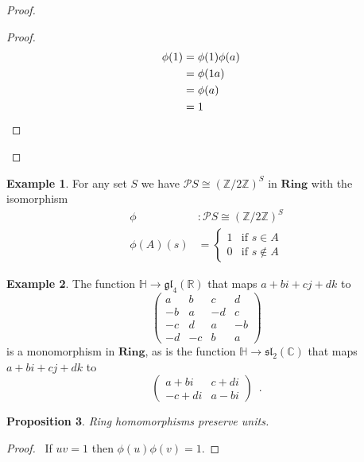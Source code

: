 \documentclass{book}
\let\qed\relax
\newtheorem{prop}{Proposition}[chapter]
\theoremstyle{definition}
\newtheorem{ex}[prop]{Example}
\begin{document}
\begin{proof}
\pf
{}
\begin{proof}
\pf
\begin{align*}
\phi(1) & = \phi(1) \phi(a) \\
& = \phi(1a) \\
& = \phi(a) \\
& = 1 & \qed
\end{align*}
\end{proof}
\end{proof}

\begin{ex}
For any set $S$ we have $\mathcal{P} S \cong (\mathbb{Z} / 2 \mathbb{Z})^S$ in $\mathbf{Ring}$ with the isomorphism
\begin{align*}
\phi & : \mathcal{P} S \cong (\mathbb{Z} / 2 \mathbb{Z})^S \\
\phi(A)(s) & = \begin{cases}
1 & \text{if } s \in A \\
0 & \text{if } s \notin A
\end{cases}
\end{align*}
\end{ex}

\begin{ex}
The function $\mathbb{H} \rightarrow \mathfrak{gl}_4(\mathbb{R})$ that maps $a + bi + cj + dk$ to
\[ \left( \begin{array}{cccc}
a & b & c & d \\
-b & a & -d & c \\
-c & d & a & -b \\
-d & -c & b & a
\end{array} \right) \]
is a monomorphism in $\mathbf{Ring}$, as is the function $\mathbb{H} \rightarrow \mathfrak{sl}_2(\mathbb{C})$ that maps $a + bi + cj + dk$ to
\[ \left( \begin{array}{cc}
a + bi & c + di \\
-c + di & a - bi
\end{array} \right) \enspace . \]
\end{ex}

\begin{prop}
Ring homomorphisms preserve units.
\end{prop}

\begin{proof}
\pf\ If $uv = 1$ then $\phi(u) \phi(v) = 1$. \qed
\end{proof}
\end{document}
